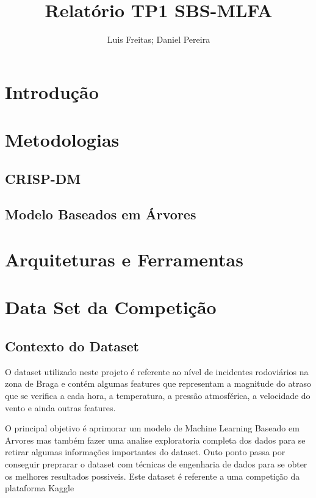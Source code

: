 \documentclass[a4paper,10pt]{article}
\title{Relatório TP1 SBS-MLFA}
\author{Luis Freitas; Daniel Pereira}
\begin{document}
\maketitle

\begin{abstract}

\end{abstract}

\section{Introdução}
\newpage
\section{Metodologias}
\subsection{CRISP-DM}
\subsection{Modelo Baseados em Árvores}
\newpage



\section{Arquiteturas e Ferramentas}
\newpage

\section{Data Set da Competição}

\newpage


\subsection{Contexto do Dataset}
O dataset utilizado neste projeto é referente ao nível de incidentes rodoviários na zona de Braga e contém algumas features que representam a magnitude do atraso que se verifica a cada hora, a temperatura, a pressão atmosférica, a velocidade do vento e ainda outras features. 

O principal objetivo é aprimorar um modelo de Machine Learning Baseado em Arvores mas também fazer uma analise exploratoria completa dos dados para se retirar algumas informações importantes do dataset. Outo ponto passa por conseguir preprarar o dataset com técnicas de engenharia de dados para se obter os melhores resultados possiveis. Este dataset é referente a uma competição da plataforma Kaggle
\end{document}
